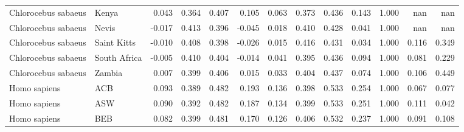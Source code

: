 \begin{longtable}{llrrrrrrrrrrr}
 Chlorocebus sabaeus &                     Kenya &                              0.043 &                               0.364 &                 0.407 &                 0.105 &                              0.063 &                               0.373 &                 0.436 &                 0.143 &   1.000 &    nan &    nan \\
 Chlorocebus sabaeus &                     Nevis &                             -0.017 &                               0.413 &                 0.396 &                -0.045 &                              0.018 &                               0.410 &                 0.428 &                 0.041 &   1.000 &    nan &    nan \\
 Chlorocebus sabaeus &               Saint Kitts &                             -0.010 &                               0.408 &                 0.398 &                -0.026 &                              0.015 &                               0.416 &                 0.431 &                 0.034 &   1.000 &  0.116 &  0.349 \\
 Chlorocebus sabaeus &              South Africa &                             -0.005 &                               0.410 &                 0.404 &                -0.014 &                              0.041 &                               0.395 &                 0.436 &                 0.094 &   1.000 &  0.081 &  0.229 \\
 Chlorocebus sabaeus &                    Zambia &                              0.007 &                               0.399 &                 0.406 &                 0.015 &                              0.033 &                               0.404 &                 0.437 &                 0.074 &   1.000 &  0.106 &  0.449 \\
        Homo sapiens &                       ACB &                              0.093 &                               0.389 &                 0.482 &                 0.193 &                              0.136 &                               0.398 &                 0.533 &                 0.254 &   1.000 &  0.067 &  0.077 \\
        Homo sapiens &                       ASW &                              0.090 &                               0.392 &                 0.482 &                 0.187 &                              0.134 &                               0.399 &                 0.533 &                 0.251 &   1.000 &  0.111 &  0.042 \\
        Homo sapiens &                       BEB &                              0.082 &                               0.399 &                 0.481 &                 0.170 &                              0.126 &                               0.406 &                 0.532 &                 0.237 &   1.000 &  0.091 &  0.108 \\

\end{longtable}
